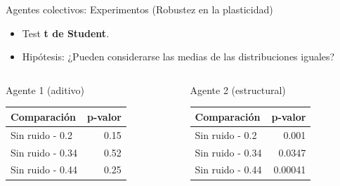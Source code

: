 \documentclass[aspectratio=169]{beamer}
\begin{document}
\begin{frame}{Agentes colectivos: Experimentos (Robustez en la plasticidad)}
  \begin{itemize}
    \item Test \textbf{t de Student}.
    \item Hipótesis: ¿Pueden considerarse las medias de las distribuciones iguales?
  \end{itemize}
  \begin{columns}
    \begin{column}{0.47\textwidth}
      \begin{block}{Agente 1 (aditivo)}
        \begin{table}
         \begin{tabular}{lr}
           \toprule
           Comparación & p-valor\\
           \midrule
           Sin ruido - 0.2 & 0.15\\
           Sin ruido - 0.34 & 0.52\\
           Sin ruido - 0.44 & 0.25\\
           \bottomrule
         \end{tabular}
       \end{table}
    \end{block}
    \end{column}
    \begin{column}{0.5\textwidth}
      \begin{block}{Agente 2 (estructural)}
        \begin{table}
         \begin{tabular}{lr}
           \toprule
           Comparación & p-valor\\
           \midrule
           Sin ruido - 0.2 & 0.001\\
           Sin ruido - 0.34 & 0.0347\\
           Sin ruido - 0.44 & 0.00041\\
           \bottomrule
         \end{tabular}
       \end{table}
      \end{block}
    \end{column}
  \end{columns}
\end{frame}
\end{document}
